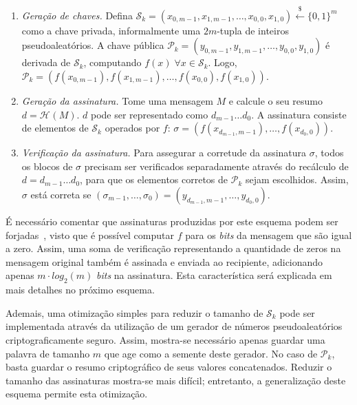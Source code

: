 \documentclass[12pt]{report}
\newcommand{\pk}{\mathcal{P}_k}
\newcommand{\sk}{\mathcal{S}_k}
\newcommand{\hash}[2][]{\mathcal{H}^{#1}(#2)}
\newcommand{\binwds}[1]{\{0, 1\}^{#1}}
\begin{document}
\begin{enumerate}

  \item[] \emph{Geração de chaves.} Defina $\sk{} = (x_{0, m-1}, x_{1, m-1},
      \dots, x_{0,0}, x_{1,0}) \stackrel{\$}{\longleftarrow} \binwds{m}$ como a
        chave privada, informalmente uma $2m$-tupla de inteiros
        pseudoaleatórios. A chave pública $\pk{} = (y_{0, m-1}, y_{1, m-1},
        \dots, y_{0,0}, y_{1,0})$ é derivada de $\sk{}$, computando $f(x) \;
        \forall x \in  \sk{}$. Logo, $\pk{} = (f(x_{0, m-1}), f(x_{1, m-1}),
        \dots, f(x_{0,0}), f(x_{1,0}))$.

  \item[] \emph{Geração da assinatura.} Tome uma mensagem $M$ e calcule o seu
      resumo $d = \hash{M}$. $d$ pode ser representado como $d_{m-1} \dots
        d_0$. A assinatura consiste de elementos de $\sk{}$ operados por $f$:
        $\sigma = (f(x_{d_{m-1}, m-1}), \dots, f(x_{d_0, 0}))$.

  \item[] \emph{Verificação da assinatura.} Para assegurar a corretude da
      assinatura $\sigma$, todos os blocos de $\sigma$ precisam ser verificados
        separadamente através do recálculo de $d = d_{m-1} \dots d_0$, para que
        os elementos corretos de $\pk{}$ sejam escolhidos.  Assim, $\sigma$
        está correta se $(\sigma_{m-1}, \dots, \sigma_0) = (y_{d_{m-1}, m-1},
        \dots, y_{d_{0}, 0})$.

\end{enumerate}

É necessário comentar que assinaturas produzidas por este esquema podem ser
forjadas~\cite{Merkle:1989:CDS:118209.118230}, visto que é possível computar
$f$ para os \emph{bits} da mensagem que são igual a zero. Assim, uma soma de
verificação representando a quantidade de zeros na mensagem original também é
assinada e enviada ao recipiente, adicionando apenas $m \cdot log_2(m)$
\emph{bits} na assinatura. Esta característica será explicada em mais detalhes
no próximo esquema.

Ademais, uma otimização simples para reduzir o tamanho de $\sk{}$ pode
ser implementada através da utilização de um gerador de números
pseudoaleatórios criptograficamente seguro. Assim, mostra-se necessário apenas
guardar uma palavra de tamanho $m$ que age como a semente deste gerador. No
caso de $\pk{}$, basta guardar o resumo criptográfico de seus valores
concatenados. Reduzir o tamanho das assinaturas mostra-se mais difícil;
entretanto, a generalização deste esquema permite esta otimização.
\end{document}
